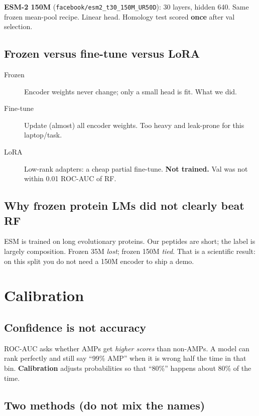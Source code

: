 \documentclass[11pt,a4paper]{report}
\begin{document}
\textbf{ESM-2 150M} (\texttt{facebook/esm2\_t30\_150M\_UR50D}): 30 layers, hidden 640. Same frozen mean-pool recipe. Linear head. Homology test scored \textbf{once} after val selection.

\section{Frozen versus fine-tune versus LoRA}

\begin{description}
\item[Frozen] Encoder weights never change; only a small head is fit. What we did.
\item[Fine-tune] Update (almost) all encoder weights. Too heavy and leak-prone for this laptop/task.
\item[LoRA] Low-rank adapters: a cheap partial fine-tune. \textbf{Not trained.} Val was not within 0.01 ROC-AUC of RF.
\end{description}

\section{Why frozen protein LMs did not clearly beat RF}

ESM is trained on long evolutionary proteins. Our peptides are short; the label is largely composition. Frozen 35M \emph{lost}; frozen 150M \emph{tied}. That is a scientific result: on this split you do not need a 150M encoder to ship a demo.

\chapter{Calibration}
\label{ch:cal}

\section{Confidence is not accuracy}

ROC-AUC asks whether AMPs get \emph{higher scores} than non-AMPs. A model can rank perfectly and still say ``99\% AMP'' when it is wrong half the time in that bin. \textbf{Calibration} adjusts probabilities so that ``80\%'' happens about 80\% of the time.

\section{Two methods (do not mix the names)}
\end{document}
